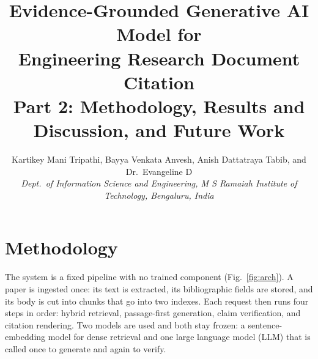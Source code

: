 \documentclass[10pt,twocolumn,letterpaper]{article}
\begin{document}
\title{\vspace{-8pt}\LARGE Evidence-Grounded Generative AI Model for\\Engineering Research Document Citation\\[4pt]
\normalsize Part 2: Methodology, Results and Discussion, and Future Work}
\author{\normalsize Kartikey Mani Tripathi, Bayya Venkata Anvesh, Anish Dattatraya Tabib, and Dr.\ Evangeline D\\
\normalsize\itshape Dept.\ of Information Science and Engineering, M S Ramaiah Institute of Technology, Bengaluru, India}
\date{}
\maketitle
\setcounter{section}{2}  %
\setcounter{table}{1}    %

\section{Methodology}
The system is a fixed pipeline with no trained component (Fig.~\ref{fig:arch}). A paper is ingested once: its text is extracted, its bibliographic fields are stored, and its body is cut into chunks that go into two indexes. Each request then runs four steps in order: hybrid retrieval, passage-first generation, claim verification, and citation rendering. Two models are used and both stay frozen: a sentence-embedding model for dense retrieval and one large language model (LLM) that is called once to generate and again to verify.
\end{document}
